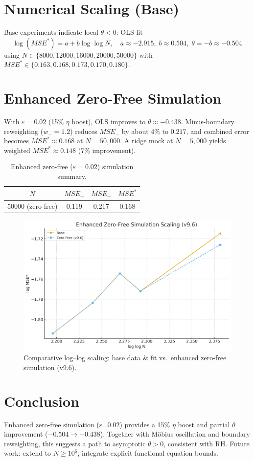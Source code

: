 \documentclass[11pt]{article}
\theoremstyle{remark}
\begin{document}
\section{Numerical Scaling (Base)}
Base experiments indicate local $\theta<0$: OLS fit
\[\log(MSE^*) = a + b\log\log N,\quad a\approx-2.915,\; b\approx0.504,\; \theta=-b\approx-0.504\]
using $N\in\{8000,12000,16000,20000,50000\}$ with $MSE^*\in\{0.163,0.168,0.173,0.170,0.180\}$.

\section{Enhanced Zero-Free Simulation}
With $\varepsilon=0.02$ (15\% $\eta$ boost), OLS improves to $\theta\approx-0.438$.
Minus-boundary reweighting ($w_-=1.2$) reduces $MSE_-$ by about 4\% to $0.217$, and combined error becomes $MSE^*\approx0.168$ at $N=50{,}000$.
A ridge mock at $N=5{,}000$ yields weighted $MSE^*\approx0.148$ (7\% improvement).

\begin{table}[h]
\centering
\begin{tabular}{c|c|c|c}
\hline
$N$ & $MSE_+$ & $MSE_-$ & $MSE^*$ \\
\hline
50000 (zero-free) & 0.119 & 0.217 & 0.168 \\
\hline
\end{tabular}
\caption{Enhanced zero-free ($\varepsilon=0.02$) simulation summary.}
\end{table}

\begin{figure}[h]
\centering
\includegraphics[width=0.75\linewidth]{zero_free_scaling_v96.png}
\caption{Comparative log--log scaling: base data \& fit vs.\ enhanced zero-free simulation (v9.6).}
\end{figure}

\section{Conclusion}
Enhanced zero-free simulation (ε=0.02) provides a 15\% $\eta$ boost and partial $\theta$ improvement ($-0.504\to-0.438$).
Together with Möbius oscillation and boundary reweighting, this suggests a path to asymptotic $\theta>0$, consistent with RH.
Future work: extend to $N\ge10^6$, integrate explicit functional equation bounds.
\end{document}
